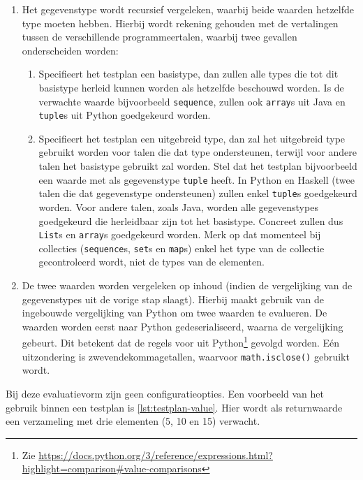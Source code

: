 \begin{enumerate}
    \item Het gegevenstype wordt recursief vergeleken, waarbij beide waarden hetzelfde type moeten hebben.
    Hierbij wordt rekening gehouden met de vertalingen tussen de verschillende programmeertalen, waarbij twee gevallen onderscheiden worden:
    \begin{enumerate}
        \item Specifieert het testplan een basistype, dan zullen alle types die tot dit basistype herleid kunnen worden als hetzelfde beschouwd worden.
        Is de verwachte waarde bijvoorbeeld \texttt{sequence}, zullen ook \texttt{array}s uit Java en \texttt{tuple}s uit Python goedgekeurd worden.
        \item Specifieert het testplan een uitgebreid type, dan zal het uitgebreid type gebruikt worden voor talen die dat type ondersteunen, terwijl voor andere talen het basistype gebruikt zal worden.
        Stel dat het testplan bijvoorbeeld een waarde met als gegevenstype \texttt{tuple} heeft.
        In Python en Haskell (twee talen die dat gegevenstype ondersteunen) zullen enkel \texttt{tuple}s goedgekeurd worden.
        Voor andere talen, zoals Java, worden alle gegevenstypes goedgekeurd die herleidbaar zijn tot het basistype.
        Concreet zullen dus \texttt{List}s en \texttt{array}s goedgekeurd worden.
        Merk op dat momenteel bij collecties (\texttt{sequence}s, \texttt{set}s en \texttt{map}s) enkel het type van de collectie gecontroleerd wordt, niet de types van de elementen.
    \end{enumerate}
    \item De twee waarden worden vergeleken op inhoud (indien de vergelijking van de gegevenstypes uit de vorige stap slaagt).
    Hierbij maakt \tested{} gebruik van de ingebouwde vergelijking van Python om twee waarden te evalueren.
    De waarden worden eerst naar Python gedeserialiseerd, waarna de vergelijking gebeurt.
    Dit betekent dat de regels voor  uit Python\footnote{Zie \url{https://docs.python.org/3/reference/expressions.html?highlight=comparison\#value-comparisons}} gevolgd worden.
    Eén uitzondering is zwevendekommagetallen, waarvoor \texttt{math.isclose()} gebruikt wordt.
\end{enumerate}

Bij deze evaluatievorm zijn geen configuratieopties.
Een voorbeeld van het gebruik binnen een testplan is \cref{lst:testplan-value}.
Hier wordt als returnwaarde een verzameling met drie elementen (5, 10 en 15) verwacht.

